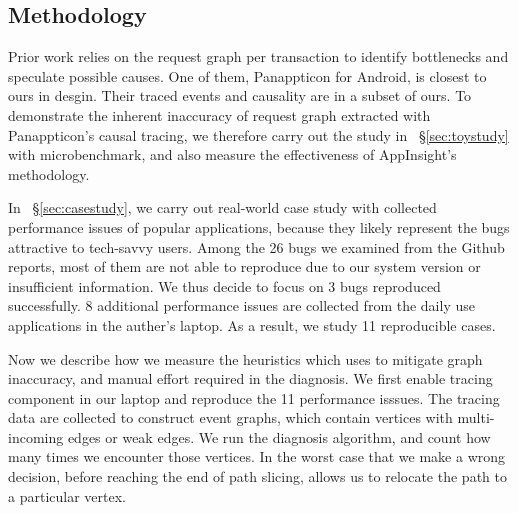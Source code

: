 \subsection{Methodology} \label{sec:methodology}


Prior work relies on the request graph per transaction to identify bottlenecks
and speculate possible causes. One of them, Panappticon for Android, is
closest to ours in desgin. Their traced events and causality are in a subset
of ours. To demonstrate the inherent inaccuracy of request graph extracted
with Panappticon's causal tracing, we therefore carry out the study in
~\S\ref{sec:toystudy} with microbenchmark, and also measure the effectiveness of
AppInsight's methodology.

In ~\S\ref{sec:casestudy}, we carry out real-world case study with collected
performance issues of popular applications, because they likely represent the
bugs attractive to tech-savvy users. Among the 26 bugs we examined from the
Github reports, most of them are not able to reproduce due to our system version
or insufficient information. We thus decide to focus on 3 bugs reproduced
successfully. 8 additional performance issues are collected from the daily use
applications in the auther's laptop. As a result, we study 11 reproducible
cases.


Now we describe how we measure the heuristics which \xxx uses to mitigate graph
inaccuracy, and manual effort required in the diagnosis. We first enable tracing
component in our laptop and reproduce the 11 performance isssues. The tracing
data are collected to construct event graphs, which contain vertices with
multi-incoming edges or weak edges. We run the \xxx diagnosis algorithm, and
count how many times we encounter those vertices. In the worst case that we make
a wrong decision, before reaching the end of path slicing, \xxx allows us to
relocate the path to a particular vertex.
